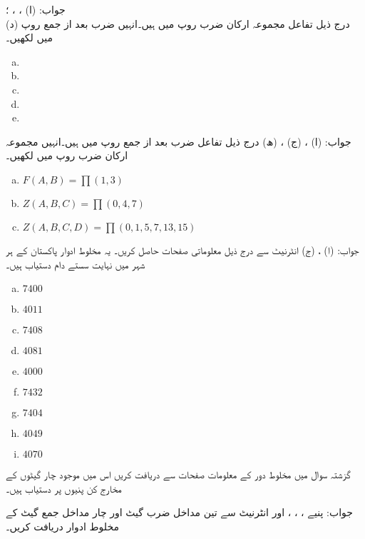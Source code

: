 جواب: (ا) ، ، ؛  \\
(د) 
درج ذیل تفاعل مجموعہ ارکان ضرب  روپ میں ہیں۔انہیں  ضرب بعد از جمع روپ میں لکھیں۔
\begin{multicols}{2}
\begin{enumerate}[a.]
\item
\item
\item
\item
\item
\end{enumerate}
\end{multicols}

جواب:  (ا) ، (ج) ،  (ھ) 
درج ذیل تفاعل  ضرب بعد از جمع  روپ میں ہیں۔انہیں مجموعہ ارکان ضرب روپ میں لکھیں۔
\begin{multicols}{2}
\begin{enumerate}[a.]
\item
\( F(A,B)=\prod (1,3)\)
\item
\( Z(A,B,C)=\prod (0,4,7) \)
\item
\( Z(A,B,C,D)=\prod (0,1,5,7,13,15) \)
\end{enumerate}
\end{multicols}

جواب: (ا) ، (ج) 
انٹرنیٹ  سے درج ذیل معلوماتی صفحات  حاصل کریں۔ یہ مخلوط ادوار پاکستان کے ہر شہر میں نہایت سستے دام  دستیاب ہیں۔
\begin{multicols}{5}
\begin{enumerate}[a.]
\item
 \( 7400 \) 
 \item
  \( 4011  \)
  \item
  \( 7408  \)
  \item
  \(  4081  \)
  \item
  \( 4000  \)
  \item
  \( 7432  \)
  \item
  \( 7404  \)
  \item
  \( 4049  \)
  \item
  \( 4070  \)
\end{enumerate}
\end{multicols}
گزشتہ سوال میں  مخلوط دور  کے  معلومات صفحات سے   دریافت کریں اس میں موجود  چار گیٹوں کے مخارج کن پنیوں پر دستیاب ہیں۔

جواب: پنیے ، ، ، اور 
انٹرنیٹ سے تین مداخل  ضرب گیٹ اور چار مداخل جمع گیٹ کے مخلوط ادوار دریافت کریں۔

